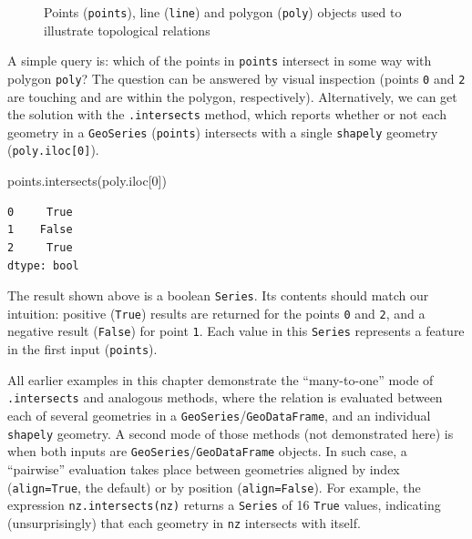 \documentclass[
  letterpaper,
]{krantz}
\newenvironment{Shaded}{\begin{snugshade}}{\end{snugshade}}
\newcommand{\DecValTok}[1]{\textcolor[rgb]{0.68,0.00,0.00}{#1}}
\newcommand{\NormalTok}[1]{\textcolor[rgb]{0.00,0.23,0.31}{#1}}
\begin{document}
\begin{figure}[H]


\caption{\label{fig-spatial-relations-geoms}Points (\texttt{points}),
line (\texttt{line}) and polygon (\texttt{poly}) objects used to
illustrate topological relations}

\end{figure}%

A simple query is: which of the points in \texttt{points} intersect in
some way with polygon \texttt{poly}? The question can be answered by
visual inspection (points \texttt{0} and \texttt{2} are touching and are
within the polygon, respectively). Alternatively, we can get the
solution with the \texttt{.intersects} method, which reports whether or
not each geometry in a \texttt{GeoSeries} (\texttt{points}) intersects
with a single \texttt{shapely} geometry (\texttt{poly.iloc{[}0{]}}).

\begin{Shaded}
\begin{Highlighting}[]
\NormalTok{points.intersects(poly.iloc[}\DecValTok{0}\NormalTok{])}
\end{Highlighting}
\end{Shaded}

\begin{verbatim}
0     True
1    False
2     True
dtype: bool
\end{verbatim}

The result shown above is a boolean \texttt{Series}. Its contents should
match our intuition: positive (\texttt{True}) results are returned for
the points \texttt{0} and \texttt{2}, and a negative result
(\texttt{False}) for point \texttt{1}. Each value in this
\texttt{Series} represents a feature in the first input
(\texttt{points}).

All earlier examples in this chapter demonstrate the ``many-to-one''
mode of \texttt{.intersects} and analogous methods, where the relation
is evaluated between each of several geometries in a
\texttt{GeoSeries}/\texttt{GeoDataFrame}, and an individual
\texttt{shapely} geometry. A second mode of those methods (not
demonstrated here) is when both inputs are
\texttt{GeoSeries}/\texttt{GeoDataFrame} objects. In such case, a
``pairwise'' evaluation takes place between geometries aligned by index
(\texttt{align=True}, the default) or by position
(\texttt{align=False}). For example, the expression
\texttt{nz.intersects(nz)} returns a \texttt{Series} of 16 \texttt{True}
values, indicating (unsurprisingly) that each geometry in \texttt{nz}
intersects with itself.
\end{document}
